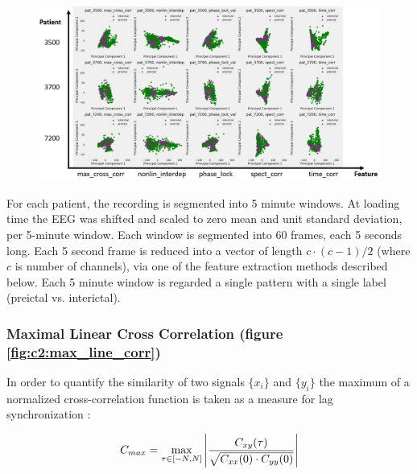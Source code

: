 \begin{figure}[htb]
    \centering
    \includegraphics[width=\textwidth]{c2Deterministic/Figs/PSP/pca_features_patients2.png}
    \label{fig:c2:pca_features}
\end{figure}

For each patient, the recording is segmented into 5 minute windows. At loading time the EEG was shifted and scaled to zero mean and unit standard deviation, per 5-minute window. Each window is segmented into 60 frames, each 5 seconds long. Each 5 second frame is reduced into a vector of length $c \cdot (c - 1) / 2$ (where $c$ is number of channels), via one of the feature extraction methods described below. Each 5 minute window is regarded a single pattern with a single label (preictal vs. interictal).


\subsubsection{Maximal Linear Cross Correlation (figure \ref{fig:c2:max_line_corr})}
In order to quantify the similarity of two signals $\{x_i\}$ and $\{y_i\}$ the maximum of a normalized cross-correlation function is taken as a measure for lag synchronization \cite{rosenblum1997phase}:

\begin{equation}
    C_{max} = \max_{\tau \in [-N,N]}{ \abs{ \frac{C_{xy}(\tau)}{\sqrt{C_{xx}(0) \cdot C_{yy}(0)} }}}
\end{equation}

